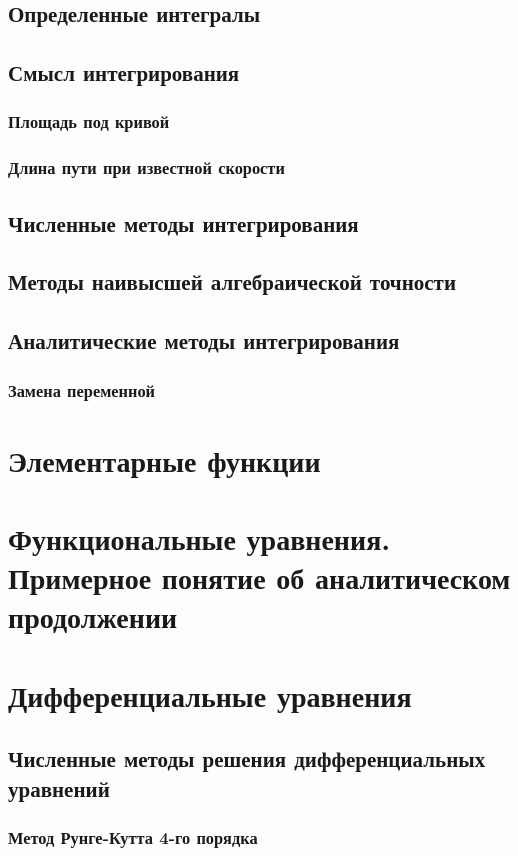 \documentclass{article}
\begin{document}
\subsection{Определенные интегралы}
\subsection{Смысл интегрирования}
\subsubsection{Площадь под кривой}
\subsubsection{Длина пути при известной скорости}
\subsection{Численные методы интегрирования}
\subsection{Методы наивысшей алгебраической точности}
\subsection{Аналитические методы интегрирования}
\subsubsection{Замена переменной}
\section{Элементарные функции}
\section{Функциональные уравнения. Примерное понятие об аналитическом продолжении}
\section{Дифференциальные уравнения}
\subsection{Численные методы решения дифференциальных уравнений}
\subsubsection{Метод Рунге-Кутта 4-го порядка}
\end{document}

